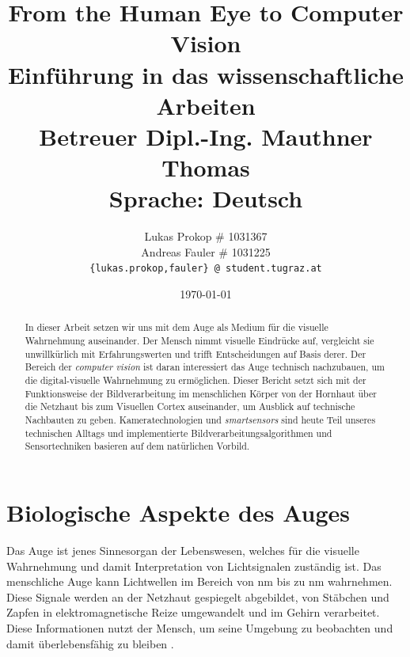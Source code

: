 \documentclass[12pt,a4paper]{article}
\title{
    \Large{From the Human Eye to Computer Vision} \\
    \small{Einführung in das wissenschaftliche Arbeiten} \\
    Betreuer Dipl.-Ing. Mauthner Thomas \\
    \footnotesize{Sprache: Deutsch}
}
\author{
    Lukas Prokop \# 1031367 \\
    Andreas Fauler \# 1031225 \\
    \small{\texttt{\{lukas.prokop,fauler\} @ student.tugraz.at}}
}
\date{\today}
\newcommand{\fw}[1]{\textit{#1}}
\begin{document}

\maketitle
\tableofcontents

\newpage

\begin{abstract}
  In dieser Arbeit setzen wir uns mit dem Auge als Medium für die
  visuelle Wahrnehmung auseinander. Der Mensch nimmt visuelle
  Eindrücke auf, vergleicht sie unwillkürlich mit Erfahrungswerten
  und trifft Entscheidungen auf Basis derer. Der Bereich der \fw{computer
  vision} ist daran interessiert das Auge technisch nachzubauen,
  um die digital-visuelle Wahrnehmung zu ermöglichen. Dieser
  Bericht setzt sich mit der Funktionsweise der Bildverarbeitung
  im menschlichen Körper von der Hornhaut über die Netzhaut bis
  zum Visuellen Cortex auseinander, um Ausblick auf technische
  Nachbauten zu geben.
  Kameratechnologien und \fw{smartsensors} sind heute Teil unseres
  technischen Alltags und implementierte Bildverarbeitungsalgorithmen
  und Sensortechniken basieren auf dem natürlichen Vorbild.
\end{abstract}

\section{Biologische Aspekte des Auges}

Das Auge ist jenes Sinnesorgan der Lebenswesen, welches für die visuelle
Wahrnehmung und damit Interpretation von Lichtsignalen zuständig ist. Das
menschliche Auge kann Lichtwellen im Bereich von \unit[350]{nm} bis zu
\unit[750]{nm} wahrnehmen. Diese Signale werden an der Netzhaut gespiegelt
abgebildet, von Stäbchen und Zapfen in elektromagnetische Reize umgewandelt
und im Gehirn verarbeitet. Diese Informationen nutzt der Mensch, um seine
Umgebung zu beobachten und damit überlebensfähig zu bleiben
\cite{sensorarray}.
\end{document}
